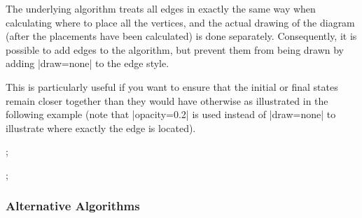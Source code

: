 \documentclass[a4paper,final]{ltxdoc}
\begin{document}
The underlying algorithm treats all edges in exactly the same way when calculating where to place all the vertices, and the actual drawing of the diagram (after the placements have been calculated) is done separately. Consequently, it is possible to add edges to the algorithm, but prevent them from being drawn by adding |draw=none| to the edge style.

This is particularly useful if you want to ensure that the initial or final states remain closer together than they would have otherwise as illustrated in the following example (note that |opacity=0.2| is used instead of |draw=none| to illustrate where exactly the edge is located).

\begin{codeexample}[]
;
\end{codeexample}
\begin{codeexample}[]
;
\end{codeexample}

\subsubsection{Alternative Algorithms}
\label{subsubsec:alternative_algorithms}
\end{document}

